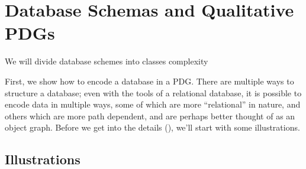 \documentclass{article}
\theoremstyle{definition}
\theoremstyle{remark}
\begin{document}
\section{Database Schemas and Qualitative PDGs}

We will divide database schemes into classes complexity



First, we show how to encode a database in a PDG. There are multiple ways to structure a database; even with the tools of a relational database, it is possible to encode data in multiple ways, some of which are more ``relational'' in nature, and others which are more path dependent, and are perhaps better thought of as an object graph. 
Before we get into the details (), we'll start with some illustrations. 


\subsection{Illustrations}
\end{document}
